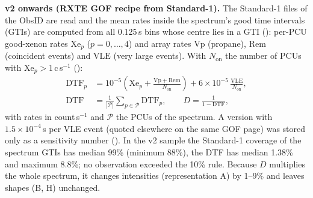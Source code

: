 \textbf{v2 onwards (RXTE GOF recipe from Standard-1).} The Standard-1 files of the ObsID are read and the mean rates
inside the spectrum's good time intervals (GTIs) are computed from all 0.125\,s bins whose centre lies in a GTI
(): per-PCU good-xenon rates $\mathrm{Xe}_p$ ($p=0,\dots,4$) and array rates $\mathrm{Vp}$
(propane), $\mathrm{Rem}$ (coincident events) and $\mathrm{VLE}$ (very large events). With $N_\mathrm{on}$ the number of
PCUs with $\mathrm{Xe}_p > 1$\,c\,s$^{-1}$ ():
\begin{equation}
\begin{split}
\mathrm{DTF}_p &= 10^{-5}\left(\mathrm{Xe}_p + \frac{\mathrm{Vp}+\mathrm{Rem}}{N_\mathrm{on}}\right) + 6\times10^{-5}\,\frac{\mathrm{VLE}}{N_\mathrm{on}},\\
\mathrm{DTF} &= \frac{1}{|\mathcal P|}\sum_{p\in\mathcal P}\mathrm{DTF}_p,\qquad D = \frac{1}{1-\mathrm{DTF}},
\end{split}\label{eq:dtf}
\end{equation}
with rates in count\,s$^{-1}$ and $\mathcal{P}$ the PCUs of the spectrum. A version with $1.5\times 10^{-4}$\,s per VLE
event (quoted elsewhere on the same GOF page) was stored only as a sensitivity number ().
In the v2 sample the Standard-1 coverage of the spectrum GTIs has median 99\% (minimum 88\%), the DTF has median 1.38\% and
maximum 8.8\%; no observation exceeded the 10\% rule. Because $D$ multiplies the whole spectrum, it changes intensities
(representation A) by 1--9\% and leaves shapes (B, H) unchanged.

